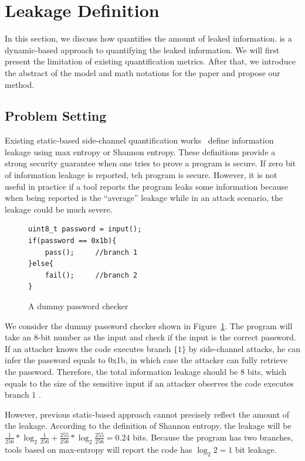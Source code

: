 \section{\tool{} Leakage Definition}
\label{sec:trace-qif}
In this section, we discuss how \tool{} quantifies the amount of leaked
information. \tool{} is a dynamic-based approach to quantifying the leaked
information. We will first present the limitation of existing quantification
metrics. After that, we introduce the abstract of the model and math notations
for the paper and propose our method.

\subsection{Problem Setting}
Existing static-based side-channel quantification
works~\cite{182946,Wichelmann:2018:MFF:3274694.3274741 } define information
leakage using max entropy or Shannon entropy. These definitions provide a strong
security guarantee when one tries to prove a program is secure.  If zero bit of
information leakage is reported, teh program is secure. However, it is not
useful in practice if a tool reports the program leaks some information because
when being reported is the ``average'' leakage while in an attack scenario, the
leakage could be much severe.


\begin{figure}[h!]
    \centering
    \begin{lstlisting}[xleftmargin=.03\textwidth,xrightmargin=.01\textwidth]
uint8_t password = input();
if(password == 0x1b){
    pass();     //branch 1
}else{
    fail();     //branch 2
}
\end{lstlisting}
    \caption{A dummy password checker}
    \label{fig:password-checker}
\end{figure}

We consider the dummy password checker shown in Figure~\ref{fig:password-checker}.
The program will take an 8-bit number as the input and check if the
input is the correct password. If an attacker knows the code executes branch
$\{{1\}}$ by side-channel attacks, he can infer the password equals to 0x1b, in
which case the attacker can fully retrieve the password. Therefore, the total
information leakage should be 8 bits, which equals to the size of the sensitive
input if an attacker observes the code executes branch $1$ .

However, previous static-based approach cannot precisely reflect the amount of
the leakage. According to the definition of Shannon entropy, the leakage will be
$\frac{1}{256}*\log_{2}\frac{1}{256} + \frac{255}{256} *\log_{2}\frac{255}{256}=
0.24$ bits. Because the program has two branches, tools based on max-entropy
will report the code has $\log_2{2} = 1$ bit leakage.

